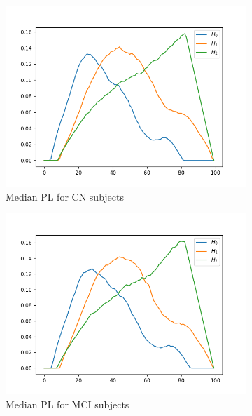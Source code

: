 \documentclass{article}
\begin{document}
\begin{figure}
  \centering
  \begin{subfigure}{0.32\textwidth}
    \includegraphics[width=\textwidth]{figures/median_pls/median_pl_CN.png}
    \caption{Median PL for CN subjects}
  \end{subfigure}
  \hfill
  \begin{subfigure}{0.32\textwidth}
    \includegraphics[width=\textwidth]{figures/median_pls/median_pl_MCI.png}
    \caption{Median PL for MCI subjects}
  \end{subfigure}
  \hfill
  \begin{subfigure}{0.32\textwidth}

\end{subfigure}
\end{figure}
\end{document}
